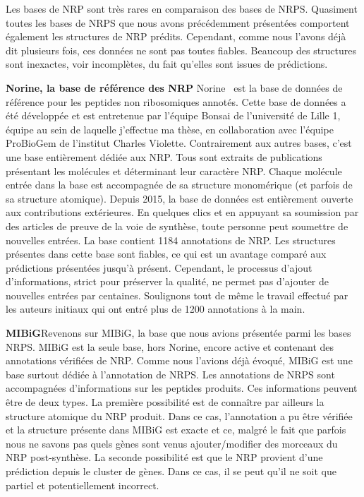 \label{bdd_nrp}

Les bases de NRP sont très rares en comparaison des bases de NRPS.
Quasiment toutes les bases de NRPS que nous avons précédemment présentées comportent également les structures de NRP prédits.
Cependant, comme nous l'avons déjà dit plusieurs fois, ces données ne sont pas toutes fiables.
Beaucoup des structures sont inexactes, voir incomplètes, du fait qu'elles sont issues de prédictions.

\textbf{Norine, la base de référence des NRP}
Norine~\cite{caboche_norine:_2008,flissi_norine_2016} est la base de données de référence pour les peptides non ribosomiques annotés.
Cette base de données a été développée et est entretenue par l'équipe Bonsai de l'université de Lille 1, équipe au sein de laquelle j'effectue ma thèse, en collaboration avec l'équipe ProBioGem de l'institut Charles Violette.
Contrairement aux autres bases, c'est une base entièrement dédiée aux NRP.
Tous sont extraits de publications présentant les molécules et déterminant leur caractère NRP.
Chaque molécule entrée dans la base est accompagnée de sa structure monomérique (et parfois de sa structure atomique).
Depuis 2015, la base de données est entièrement ouverte aux contributions extérieures.
En quelques clics et en appuyant sa soumission par des articles de preuve de la voie de synthèse, toute personne peut soumettre de nouvelles entrées.
La base contient 1184 annotations de NRP.
Les structures présentes dans cette base sont fiables, ce qui est un avantage comparé aux prédictions présentées jusqu'à présent.
Cependant, le processus d'ajout d'informations, strict pour préserver la qualité, ne permet pas d'ajouter de nouvelles entrées par centaines.
Soulignons tout de même le travail effectué par les auteurs initiaux qui ont entré plus de 1200 annotations à la main.


\textbf{MIBiG}Revenons sur MIBiG, la base que nous avions présentée parmi les bases NRPS.
MIBiG est la seule base, hors Norine, encore active et contenant des annotations vérifiées de NRP.
Comme nous l'avions déjà évoqué, MIBiG est une base surtout dédiée à l'annotation de NRPS.
Les annotations de NRPS sont accompagnées d'informations sur les peptides produits.
Ces informations peuvent être de deux types.
La première possibilité est de connaître par ailleurs la structure atomique du NRP produit.
Dans ce cas, l'annotation a pu être vérifiée et la structure présente dans MIBiG est exacte et ce, malgré le fait que parfois nous ne savons pas quels gènes sont venus ajouter/modifier des morceaux du NRP post-synthèse.
La seconde possibilité est que le NRP provient d'une prédiction depuis le cluster de gènes.
Dans ce cas, il se peut qu'il ne soit que partiel et potentiellement incorrect.

